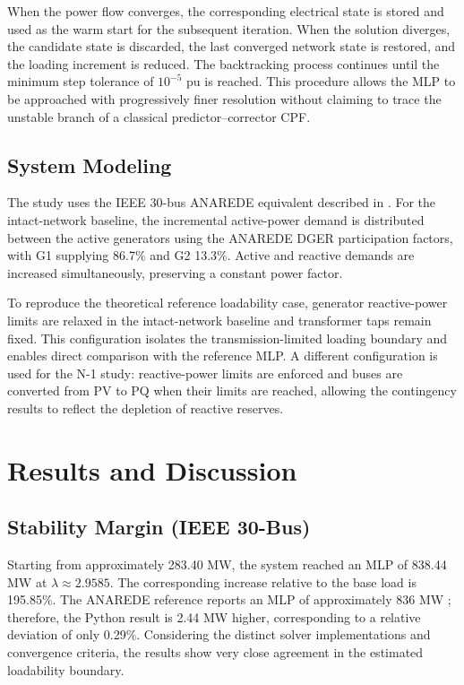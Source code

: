 \documentclass[conference]{IEEEtran}
\begin{document}
When the power flow converges, the corresponding electrical state is stored and used as the warm start for the subsequent iteration. When the solution diverges, the candidate state is discarded, the last converged network state is restored, and the loading increment is reduced. The backtracking process continues until the minimum step tolerance of $10^{-5}$ pu is reached. This procedure allows the MLP to be approached with progressively finer resolution without claiming to trace the unstable branch of a classical predictor--corrector CPF.

\subsection{System Modeling}

The study uses the IEEE 30-bus ANAREDE equivalent described in \cite{madureira2023avaliacao}. For the intact-network baseline, the incremental active-power demand is distributed between the active generators using the ANAREDE DGER participation factors, with G1 supplying 86.7\% and G2 13.3\%. Active and reactive demands are increased simultaneously, preserving a constant power factor.

To reproduce the theoretical reference loadability case, generator reactive-power limits are relaxed in the intact-network baseline and transformer taps remain fixed. This configuration isolates the transmission-limited loading boundary and enables direct comparison with the reference MLP. A different configuration is used for the N-1 study: reactive-power limits are enforced and buses are converted from PV to PQ when their limits are reached, allowing the contingency results to reflect the depletion of reactive reserves.

\section{Results and Discussion}
\label{sec:results}

\subsection{Stability Margin (IEEE 30-Bus)}

Starting from approximately 283.40 MW, the system reached an MLP of 838.44 MW at $\lambda\approx2.9585$. The corresponding increase relative to the base load is 195.85\%. The ANAREDE reference reports an MLP of approximately 836 MW \cite{madureira2023avaliacao}; therefore, the Python result is 2.44 MW higher, corresponding to a relative deviation of only 0.29\%. Considering the distinct solver implementations and convergence criteria, the results show very close agreement in the estimated loadability boundary.
\end{document}
